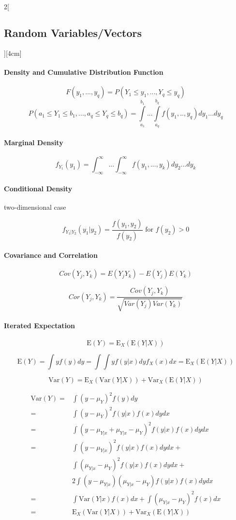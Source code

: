 \documentclass[8pt]{extarticle}
\begin{document}
\begin{multicols}{2}[\subsection{Random Variables/Vectors}][4cm]
\paragraph{Density and Cumulative Distribution Function}

$$F(y_1, ..., y_q) = P(Y_1 \leq y_1, ..., Y_q \leq y_q)$$
$$P(a_1 {\leq} Y_1 {\leq} b_1, ..., a_q {\leq} Y_q {\leq} b_q) = \int\limits_{a_1}^{b_1} ...\int\limits_{a_q}^{b_q} f(y_1, .., y_q)dy_1...dy_q$$

\paragraph{Marginal Density}

$$f_{Y_1}(y_1) = \int_{-\infty}^{\infty}...\int_{-\infty}^{\infty} f(y_1,...,y_k)dy_2...dy_k$$

\paragraph{Conditional Density} two-dimensional case

$$f_{Y_1|Y_2}(y_1|y_2) = \frac{f(y_1, y_2)}{f(y_2)} \text{ for } f(y_2) > 0$$

\paragraph{Covariance and Correlation}

$$Cov(Y_j,Y_k) = E(Y_jY_k) - E(Y_j)E(Y_k)$$

$$Cor(Y_j,Y_k) = \frac{Cov(Y_j,Y_k)}{\sqrt{Var(Y_j)Var(Y_k)}}$$

\paragraph{Iterated Expectation}

$$\mathrm{E}(Y)=\mathrm{E}_X(\mathrm{E}(Y|X))$$
\begin{Proof}
$$\mathrm{E}(Y) = \int yf(y)dy = \int\int y f(y|x)dy f_X(x)dx = \mathrm{E}_X(\mathrm{E}(Y|X))$$
\end{Proof}
$$\mathrm{Var}(Y) = \mathrm{E}_X(\mathrm{Var}(Y|X)) + \mathrm{Var}_X(\mathrm{E}(Y|X))$$
\begin{Proof}
\begin{align*}
\mathrm{Var}(Y) =&  \int (y- \mu_Y)^2 f(y)dy\\
=& \int (y- \mu_Y)^2 f(y|x)f(x)dydx\\
=& \int (y- \mu_{Y|x} + \mu_{Y|x} - \mu_Y)^2 f(y|x)f(x)dydx\\
=& \int (y- \mu_{Y|x})^2 f(y|x)f(x)dydx + \\
 & \int (\mu_{Y|x} - \mu_Y)^2 f(y|x)f(x)dydx + \\
 & 2 \int (y- \mu_{Y|x})(\mu_{Y|x} - \mu_Y) f(y|x)f(x)dydx \\
=& \int \mathrm{Var}(Y|x)f(x)dx + \int (\mu_{Y|x} - \mu_Y)^2f(x)dx\\
=& \mathrm{E}_X(\mathrm{Var}(Y|X)) + \mathrm{Var}_X(\mathrm{E}(Y|X))
\end{align*}
\end{Proof}

\end{multicols}
\end{document}
